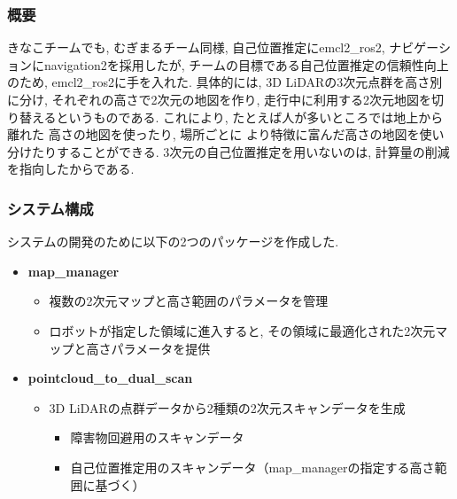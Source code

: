 \subsubsection{概要}

きなこチームでも, むぎまるチーム同様, 
自己位置推定にemcl2\_ros2, ナビゲーションにnavigation2を採用したが, 
チームの目標である自己位置推定の信頼性向上のため, 
emcl2\_ros2に手を入れた. 
具体的には, 3D LiDARの3次元点群を高さ別に分け, 
それぞれの高さで2次元の地図を作り, 
走行中に利用する2次元地図を切り替えるというものである. 
これにより, たとえば人が多いところでは地上から離れた
高さの地図を使ったり, 場所ごとに
より特徴に富んだ高さの地図を使い分けたりすることができる. 
3次元の自己位置推定を用いないのは, 
計算量の削減を指向したからである. 



\subsubsection{システム構成}
システムの開発のために以下の2つのパッケージを作成した. 

\begin{itemize}
  \item \textbf{map\_manager}
    \begin{itemize}
      \item 複数の2次元マップと高さ範囲のパラメータを管理
      \item ロボットが指定した領域に進入すると, その領域に最適化された2次元マップと高さパラメータを提供
    \end{itemize}
  \item \textbf{pointcloud\_to\_dual\_scan}
    \begin{itemize}
      \item 3D LiDARの点群データから2種類の2次元スキャンデータを生成
        \begin{itemize}
          \item 障害物回避用のスキャンデータ
          \item 自己位置推定用のスキャンデータ（map\_managerの指定する高さ範囲に基づく）
        \end{itemize}
    \end{itemize}
\end{itemize}

